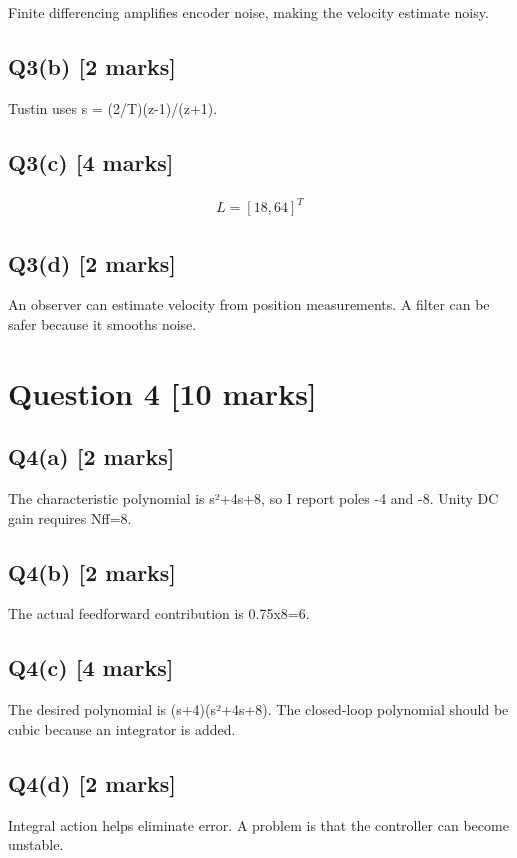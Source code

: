 \documentclass[11pt,a4paper]{article}
\begin{document}
Finite differencing amplifies encoder noise, making the velocity estimate noisy.

\subsection*{Q3(b) \hfill [2 marks]}

Tustin uses s = (2/T)(z-1)/(z+1).

\subsection*{Q3(c) \hfill [4 marks]}

\[\begin{aligned}L = [18,64]^T\end{aligned}\]

\subsection*{Q3(d) \hfill [2 marks]}

An observer can estimate velocity from position measurements.
A filter can be safer because it smooths noise.

\section*{Question 4 \hfill [10 marks]}
\subsection*{Q4(a) \hfill [2 marks]}

The characteristic polynomial is s²+4s+8, so I report poles -4 and -8.
Unity DC gain requires Nff=8.

\subsection*{Q4(b) \hfill [2 marks]}

The actual feedforward contribution is 0.75x8=6.

\subsection*{Q4(c) \hfill [4 marks]}

The desired polynomial is (s+4)(s²+4s+8).
The closed-loop polynomial should be cubic because an integrator is added.

\subsection*{Q4(d) \hfill [2 marks]}

Integral action helps eliminate error.
A problem is that the controller can become unstable.
\end{document}
